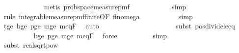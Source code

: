 \begin{isabellebody}
\ \ \ \ \ \ \ \ \ \ \ \isamarkupfalse%
\ {\isacharparenleft}{\kern0pt}metis\ prob{\isacharunderscore}{\kern0pt}space{\isacharunderscore}{\kern0pt}measure{\isacharunderscore}{\kern0pt}pmf{\isacharparenright}{\kern0pt}\isanewline
\ \ \ \ \ \ \ \ \ \ \isamarkupfalse%
\ simp\isanewline
\ \ \ \ \ \ \ \ \ \isamarkupfalse%
\ {\isacharparenleft}{\kern0pt}rule\ integrable{\isacharunderscore}{\kern0pt}measure{\isacharunderscore}{\kern0pt}pmf{\isacharunderscore}{\kern0pt}finite{\isacharbrackleft}{\kern0pt}OF\ fin{\isacharunderscore}{\kern0pt}omega{\isacharunderscore}{\kern0pt}{}{\isacharbrackright}{\kern0pt}{\isacharparenright}{\kern0pt}\isanewline
\ \ \ \ \ \ \ \ \ \isamarkupfalse%
\ simp\isanewline
\ \ \ \ \ \ \ \ \isamarkupfalse%
\ t{\isacharunderscore}{\kern0pt}ge{\isacharunderscore}{\kern0pt}{}\ b{\isacharunderscore}{\kern0pt}ge{\isacharunderscore}{\kern0pt}{}\ p{\isacharunderscore}{\kern0pt}ge{\isacharunderscore}{\kern0pt}{}\ m{\isacharunderscore}{\kern0pt}ge{\isacharunderscore}{\kern0pt}{}\ m{\isacharunderscore}{\kern0pt}eq{\isacharunderscore}{\kern0pt}F{\isacharunderscore}{\kern0pt}{}\ \isamarkupfalse%
\ auto\isanewline
\ \ \ \ \ \ \isamarkupfalse%
\ \isamarkupfalse%
\ {\isachardoublequoteopen}{\isachardot}{\kern0pt}{\isachardot}{\kern0pt}{\isachardot}{\kern0pt}\ {\isasymle}\ {}{\isacharslash}{\kern0pt}{}{\isachardoublequoteclose}\isanewline
\ \ \ \ \ \ \ \ \isamarkupfalse%
\ {\isacharparenleft}{\kern0pt}subst\ pos{\isacharunderscore}{\kern0pt}divide{\isacharunderscore}{\kern0pt}le{\isacharunderscore}{\kern0pt}eq{\isacharparenright}{\kern0pt}\ \isanewline
\ \ \ \ \ \ \ \ \isamarkupfalse%
\ b{\isacharunderscore}{\kern0pt}ge{\isacharunderscore}{\kern0pt}{}\ p{\isacharunderscore}{\kern0pt}ge{\isacharunderscore}{\kern0pt}{}\ m{\isacharunderscore}{\kern0pt}ge{\isacharunderscore}{\kern0pt}{}\ m{\isacharunderscore}{\kern0pt}eq{\isacharunderscore}{\kern0pt}F{\isacharunderscore}{\kern0pt}{}\ \isamarkupfalse%
\ force\isanewline
\ \ \ \ \ \ \ \ \isamarkupfalse%
\ simp\isanewline
\ \ \ \ \ \ \ \ \isamarkupfalse%
\ {\isacharparenleft}{\kern0pt}subst\ real{\isacharunderscore}{\kern0pt}sqrt{\isacharunderscore}{\kern0pt}pow{}{\isacharparenright}{\kern0pt}\isanewline
\ \ \ \ \ \ \ \ \isamarkupfalse%

\end{isabellebody}
